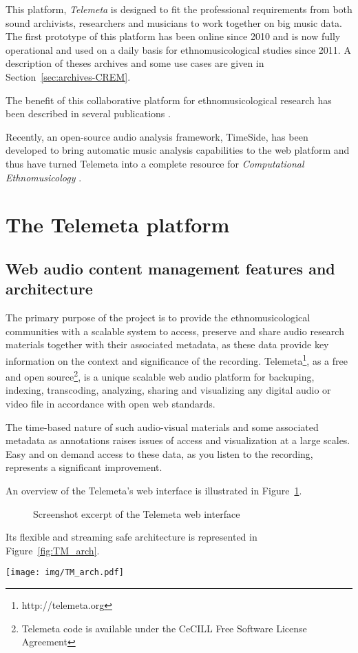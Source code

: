 \documentclass{paper}
\begin{document}
 This platform, \emph{Telemeta} is designed to fit the professional requirements from both sound archivists, researchers and musicians to work together on big music data. The first prototype of this platform has been online since 2010 and is now fully operational and used on a daily basis for ethnomusicological studies since 2011. A description of theses archives and some use cases are given in Section~\ref{sec:archives-CREM}.

The benefit of this collaborative platform for ethnomusicological research has been described in several publications \citep{Simmonot_IASA_2011, Julien_IASA_2011, Simonnot_ICTM_2014}.

Recently, an open-source audio analysis framework, TimeSide, has been developed to bring automatic music analysis capabilities to the web platform and thus have turned Telemeta into a complete resource for \emph{Computational Ethnomusicology} \citep{Tzanetakis_2007_JIMS, Gomez_JNMR_2013}.

 \section{The Telemeta platform}\label{sec:Telemeta}
 \subsection{Web audio content management features and architecture}
The primary purpose of the project is to provide the ethnomusicological communities with a scalable system to access, preserve and share audio research materials together with their associated metadata, as these data provide key information on the context and significance of the recording. Telemeta\footnote{http://telemeta.org}, as a free and open source\footnote{Telemeta code is available under the CeCILL Free Software License Agreement}, is a unique scalable web audio platform for backuping, indexing, transcoding, analyzing, sharing and visualizing any digital audio or video file in accordance with open web standards.

The time-based nature of such audio-visual materials and some associated metadata as annotations raises issues of access and visualization at a large scales. Easy and on demand access to these data, as you listen to the recording, represents a significant improvement.

An overview of the Telemeta's web interface is illustrated in Figure~\ref{fig:Telemeta}.
\begin{figure}
   \centering
   \caption[1]{Screenshot excerpt of the Telemeta web interface}
    \label{fig:Telemeta}
 \end{figure}
Its flexible and streaming safe architecture is represented in Figure~\ref{fig:TM_arch}.
\begin{figure*}[htbp]
  \centering
  \texttt{[image: img/TM\_arch.pdf]}
  \caption{Telemeta architecture}\label{fig:TM_arch}
\end{figure*}
\end{document}
